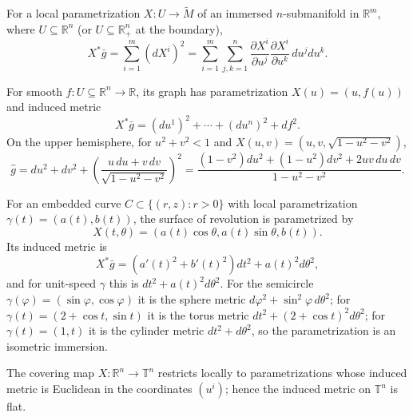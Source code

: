 For a local parametrization $X:U\to\widetilde M$ of an immersed $n$-submanifold in $\mathbb R^m$, where $U\subseteq\mathbb R^n$ (or $U\subseteq\mathbb R^n_+$ at the boundary),
\[
X^*\bar g=\sum_{i=1}^m(dX^i)^2
=\sum_{i=1}^m\sum_{j,k=1}^n\frac{\partial X^i}{\partial u^j}\frac{\partial X^i}{\partial u^k}\,du^jdu^k.
\]

\begin{example}
\label{ex:metrics-in-graph-coordinates}
\leanok
{}
For smooth $f:U\subseteq\mathbb R^n\to\mathbb R$, its graph has parametrization $X(u)=(u,f(u))$ and induced metric
\[
X^*\bar g=(du^1)^2+\cdots+(du^n)^2+df^2.
\]
On the upper hemisphere, for $u^2+v^2<1$ and $X(u,v)=(u,v,\sqrt{1-u^2-v^2})$,
\[
\hat g=du^2+dv^2+\left(\frac{u\,du+v\,dv}{\sqrt{1-u^2-v^2}}\right)^2
 =\frac{(1-v^2)du^2+(1-u^2)dv^2+2uv\,du\,dv}{1-u^2-v^2}.
\]
\end{example}

\begin{example}
\label{ex:surfaces-of-revolution}
\leanok
{}
For an embedded curve $C\subset\{(r,z):r>0\}$ with local parametrization $\gamma(t)=(a(t),b(t))$, the surface of revolution is parametrized by
\[
X(t,\theta)=(a(t)\cos\theta,a(t)\sin\theta,b(t)).\tag{2.11}
\]
Its induced metric is
\[
X^*\bar g=(a'(t)^2+b'(t)^2)dt^2+a(t)^2d\theta^2,
\]
and for unit-speed $\gamma$ this is $dt^2+a(t)^2d\theta^2$. For the semicircle $\gamma(\varphi)=(\sin\varphi,\cos\varphi)$ it is the sphere metric $d\varphi^2+\sin^2\varphi\,d\theta^2$; for $\gamma(t)=(2+\cos t,\sin t)$ it is the torus metric $dt^2+(2+\cos t)^2d\theta^2$; for $\gamma(t)=(1,t)$ it is the cylinder metric $dt^2+d\theta^2$, so the parametrization is an isometric immersion.
\end{example}

\begin{example}
\label{ex:n-torus-riemannian-submanifold}
The covering map $X:\mathbb R^n\to\mathbb T^n$ restricts locally to parametrizations whose induced metric is Euclidean in the coordinates $(u^i)$; hence the induced metric on $\mathbb T^n$ is flat.
\end{example}

